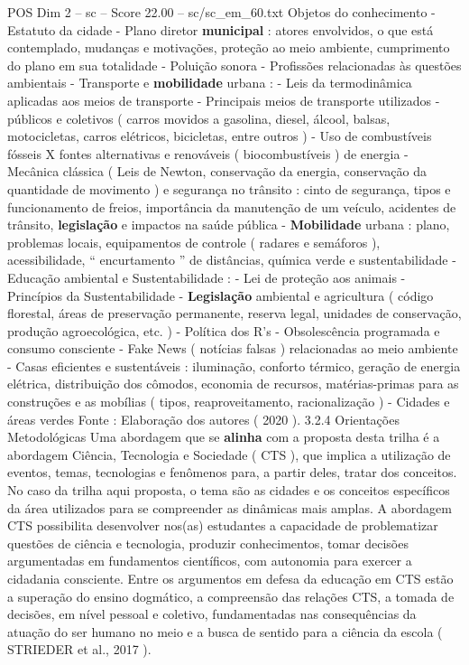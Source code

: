 \begin{textsample}{POS Dim 2 – sc – Score 22.00 – sc/sc\_em\_60.txt}
Objetos do conhecimento - Estatuto da cidade - Plano diretor \textbf{municipal} : atores envolvidos, o que está contemplado, mudanças e motivações, proteção ao meio ambiente, cumprimento do plano em sua totalidade - Poluição sonora - Profissões relacionadas às questões ambientais - Transporte e \textbf{mobilidade} urbana : - Leis da termodinâmica aplicadas aos meios de transporte - Principais meios de transporte utilizados - públicos e coletivos ( carros movidos a gasolina, diesel, álcool, balsas, motocicletas, carros elétricos, bicicletas, entre outros ) - Uso de combustíveis fósseis X fontes alternativas e renováveis ( biocombustíveis ) de energia - Mecânica clássica ( Leis de Newton, conservação da energia, conservação da quantidade de movimento ) e segurança no trânsito : cinto de segurança, tipos e funcionamento de freios, importância da manutenção de um veículo, acidentes de trânsito, \textbf{legislação} e impactos na saúde pública - \textbf{Mobilidade} urbana : plano, problemas locais, equipamentos de controle ( radares e semáforos ), acessibilidade, “ encurtamento ” de distâncias, química verde e sustentabilidade - Educação ambiental e Sustentabilidade : - Lei de proteção aos animais - Princípios da Sustentabilidade - \textbf{Legislação} ambiental e agricultura ( código florestal, áreas de preservação permanente, reserva legal, unidades de conservação, produção agroecológica, etc. ) - Política dos R’s - Obsolescência programada e consumo consciente - Fake News ( notícias falsas ) relacionadas ao meio ambiente - Casas eficientes e sustentáveis : iluminação, conforto térmico, geração de energia elétrica, distribuição dos cômodos, economia de recursos, matérias-primas para as construções e as mobílias ( tipos, reaproveitamento, racionalização ) - Cidades e áreas verdes Fonte : Elaboração dos autores ( 2020 ). 3.2.4 Orientações Metodológicas Uma abordagem que se \textbf{alinha} com a proposta desta trilha é a abordagem Ciência, Tecnologia e Sociedade ( CTS ), que implica a utilização de eventos, temas, tecnologias e fenômenos para, a partir deles, tratar dos conceitos.
No caso da trilha aqui proposta, o tema são as cidades e os conceitos específicos da área utilizados para se compreender as dinâmicas mais amplas.
A abordagem CTS possibilita desenvolver nos(as) estudantes a capacidade de problematizar questões de ciência e tecnologia, produzir conhecimentos, tomar decisões argumentadas em fundamentos científicos, com autonomia para exercer a cidadania consciente.
Entre os argumentos em defesa da educação em CTS estão a superação do ensino dogmático, a compreensão das relações CTS, a tomada de decisões, em nível pessoal e coletivo, fundamentadas nas consequências da atuação do ser humano no meio e a busca de sentido para a ciência da escola ( STRIEDER et al., 2017 ).

\end{textsample}
